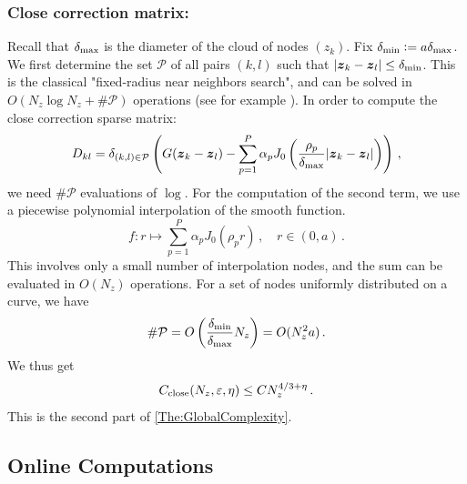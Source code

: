\documentclass[main]{subfiles}
\begin{document}
\subsubsection{Close correction matrix:} 
Recall that $\delta_{\max}$ is the diameter of the cloud of nodes $(z_k)$. 
Fix $\delta_{\min} \mathrel{\mathop:}= a \delta_{\max}$. We first determine the set $\mathcal{P}$ of all pairs $(k,l)$ such that $\left\lvert \boldsymbol{z}_k - \boldsymbol{z}_l \right\rvert \leq \delta_{\min}$. This is the classical "fixed-radius near neighbors search", and can be solved in $O(N_z \log N_z + \# \mathcal{P})$ operations (see for example \cite{bentley1975multidimensional, bentley1977complexity,turau1991fixed,dickerson1990fixed}). In order to compute the close correction sparse matrix:
\[
D_{kl} = \delta_{(k,l) \in \mathcal{P}} \left( G({\boldsymbol{z}_k - \boldsymbol{z}_l}) - \sum_{p = 1}^{P} \alpha_p J_0\left(\frac{\rho_p}{\delta_{\max}} |\boldsymbol{z}_k - \boldsymbol{z}_l|\right)\right)\,,
\]
we need $\#\mathcal{P}$ evaluations of $\log$. For the computation of the second term, we use a piecewise polynomial interpolation of the smooth function.
\[f: r \mapsto \sum_{p = 1}^{P} \alpha_p J_0(\rho_pr)\,, \quad r \in (0,a)\,.\]
This involves only a small number of interpolation nodes, and the sum can be evaluated in $O(N_z)$ operations. For a set of nodes uniformly distributed on a curve, we have
\begin{equation}
\label{eq:NombreDinteractionsProches}
\# \mathcal{P} = O\left(\dfrac{\delta_{\min}}{\delta_{\max}} N_z\right) = O(N_z^2 a)\,.
\end{equation}
We thus get
\begin{equation}
\label{Complex:assemble}
C_{\textup{close}}(N_z,\varepsilon,\eta) \leq C N_z^{4/3 + \eta}\,.
\end{equation}
This is the second part of \autoref{The:GlobalComplexity}. 
\subsection{Online Computations}
\end{document}
